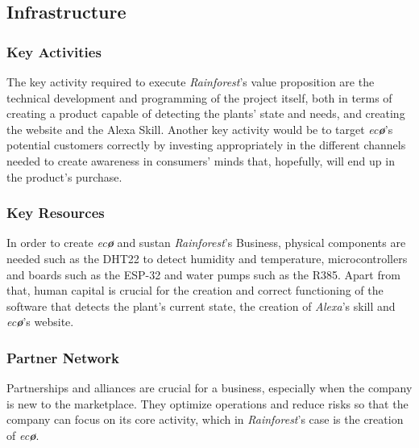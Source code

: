 \documentclass[english,runningheads,a4paper]{llncs}[2018/03/10]
\begin{document}

    \subsection*{Infrastructure}

        \subsubsection*{Key Activities}

        The key activity required to execute \textit{Rainforest}'s value
        proposition are the technical development and programming of the project
        itself, both in terms of creating a product capable of detecting the
        plants' state and needs, and creating the website and the Alexa Skill.
        Another key activity would be to target \textit{ec\textbf{\o}}'s
        potential customers correctly by investing appropriately in the
        different channels needed to create awareness in consumers' minds that,
        hopefully, will end up in the product's purchase.


        \subsubsection*{Key Resources}

        In order to create \textit{ec\textbf{\o}} and sustan
        \textit{Rainforest}'s Business, physical components are needed such as
        the DHT22 to detect humidity and temperature, microcontrollers and
        boards such as the ESP-32 and water pumps such as the R385. Apart from
        that, human capital is crucial for the creation and correct functioning
        of the software that detects the plant's current state, the creation of
        \textit{Alexa}'s skill and \textit{ec\textbf{\o}}'s website.


        \subsubsection*{Partner Network}

        Partnerships and alliances are crucial for a business, especially when
        the company is new to the marketplace. They optimize operations and
        reduce risks so that the company can focus on its core activity, which
        in \textit{Rainforest}'s case is the creation of \textit{ec\textbf{\o}}.
\end{document}

